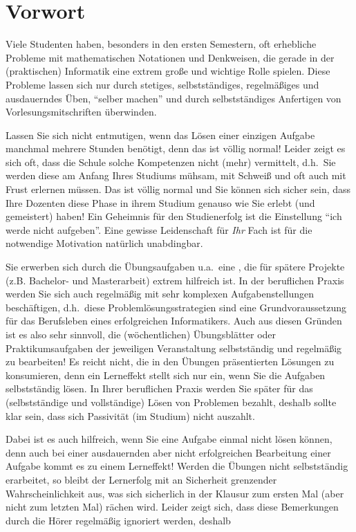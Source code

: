 \section{Vorwort}

Viele Studenten haben, besonders in den ersten Semestern, oft
erhebliche Probleme mit mathematischen Notationen und Denkweisen, die
gerade in der (praktischen) Informatik eine extrem große und wichtige
Rolle spielen. Diese Probleme lassen sich nur durch stetiges,
selbstständiges, regelmäßiges und ausdauerndes Üben, "`selber
machen"' und durch selbstständiges Anfertigen von
Vorlesungsmitschriften überwinden. 

Lassen Sie sich nicht entmutigen, wenn das Lösen einer einzigen
Aufgabe manchmal mehrere Stunden benötigt, denn das ist völlig normal!
Leider zeigt es sich oft, dass die Schule solche Kompetenzen nicht
(mehr) vermittelt, d.h.~Sie werden diese am Anfang Ihres Studiums
mühsam, mit Schweiß und oft auch mit Frust erlernen müssen. Das ist 
völlig normal und Sie können sich sicher sein, dass Ihre Dozenten
diese Phase in ihrem Studium genauso wie Sie erlebt (und gemeistert) 
haben! Ein Geheimnis für den Studienerfolg ist die Einstellung "`ich werde nicht
aufgeben"'. Eine gewisse Leidenschaft für \emph{Ihr} Fach ist für die
notwendige Motivation natürlich unabdingbar. 

Sie erwerben sich durch die Übungsaufgaben u.a.~eine
, die für spätere Projekte (z.B. Bachelor- und
Masterarbeit) extrem hilfreich ist. In der beruflichen Praxis werden
Sie sich auch regelmäßig mit sehr komplexen Aufgabenstellungen
beschäftigen, d.h.~diese Problemlösungsstrategien sind eine
Grundvoraussetzung für das Berufsleben eines erfolgreichen
Informatikers. Auch aus diesen Gründen ist es also sehr sinnvoll, die
(wöchentlichen) Übungsblätter oder Praktikumsaufgaben der jeweiligen
Veranstaltung selbstständig und regelmäßig zu bearbeiten! Es reicht
nicht, die in den Übungen präsentierten Lösungen zu konsumieren, denn
ein Lerneffekt stellt sich nur ein, wenn Sie die Aufgaben
selbstständig lösen. In Ihrer beruflichen Praxis werden Sie später
für das (selbstständige und vollständige) Lösen von Problemen bezahlt, deshalb 
sollte klar sein, dass sich Passivität (im Studium)  nicht auszahlt. 
 
Dabei ist es auch hilfreich, wenn Sie eine Aufgabe einmal nicht lösen können,
denn auch bei einer ausdauernden aber nicht erfolgreichen Bearbeitung
einer Aufgabe kommt es zu einem Lerneffekt! Werden die Übungen nicht
selbstständig erarbeitet, so bleibt der Lernerfolg mit an Sicherheit
grenzender Wahrscheinlichkeit aus, was sich sicherlich in der Klausur
zum ersten Mal (aber nicht zum letzten Mal) rächen wird. Leider zeigt
sich, dass diese Bemerkungen durch die Hörer regelmäßig ignoriert
werden, deshalb

